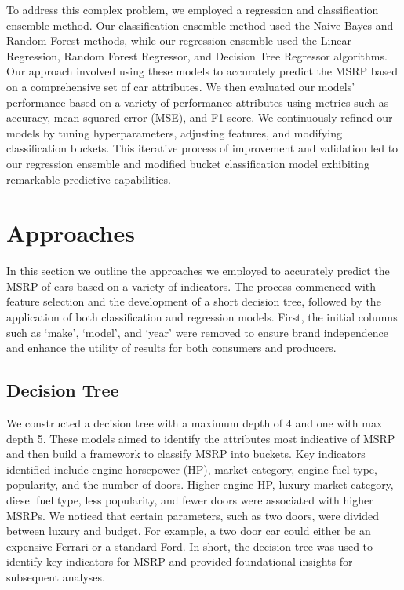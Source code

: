 \documentclass{article}
\begin{document}
\newline
\newline
To address this complex problem, we employed a regression and classification ensemble method. Our classification ensemble method used the Naive Bayes and Random Forest methods, while our regression ensemble used the Linear Regression, Random Forest Regressor, and Decision Tree Regressor algorithms. Our approach involved using these models to accurately predict the MSRP based on a comprehensive set of car attributes. We then evaluated our models' performance based on a variety of performance attributes using metrics such as accuracy, mean squared error (MSE), and F1 score. We continuously refined our models by tuning hyperparameters, adjusting features, and modifying classification buckets. This iterative process of improvement and validation led to our regression ensemble and modified bucket classification model exhibiting remarkable predictive capabilities.



\section{Approaches}

In this section we outline the approaches we employed to accurately predict the MSRP of cars based on a variety of indicators. The process commenced with feature selection and the development of a short decision tree, followed by the application of both classification and regression models. First, the initial columns such as ‘make’, ‘model’, and ‘year’ were removed to ensure brand independence and enhance the utility of results for both consumers and producers. 

\subsection{Decision Tree}
We constructed a decision tree with a maximum depth of 4 and one with max depth 5. These models aimed to identify the attributes most indicative of MSRP and then build a framework to classify MSRP into buckets. Key indicators identified include engine horsepower (HP), market category, engine fuel type, popularity, and the number of doors. Higher engine HP, luxury market category, diesel fuel type, less popularity, and fewer doors were associated with higher MSRPs. We noticed that certain parameters, such as two doors, were divided between luxury and budget. For example, a two door car could either be an expensive Ferrari or a standard Ford. In short, the decision tree was used to identify key indicators for MSRP and provided foundational insights for subsequent analyses. \newline
\end{document}
